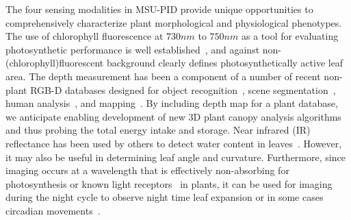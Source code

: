 
The four sensing modalities in MSU-PID provide unique opportunities to comprehensively characterize plant morphological and physiological phenotypes. 
The use of chlorophyll fluorescence at $730nm$ to $750nm$ as a tool for evaluating photosynthetic performance is well established~\cite{baker2008chlorophyll}, and against non-(chlorophyll)fluorescent background clearly defines photosynthetically active leaf area.
The depth measurement has been a component of a number of recent non-plant RGB-D databases designed for object recognition~\cite{Lai2011}, scene segmentation~\cite{Silberman2011}, human analysis~\cite{Sung2011,Barbosa:reid12}, and mapping~\cite{sturm12iros}. 
By including depth map for a plant database, we anticipate enabling development of new $3$D plant canopy analysis algorithms and thus probing the total energy intake and storage.
Near infrared (IR) reflectance has been used by others to detect water content in leaves~\cite{chen2014dissecting}.  
However, it may also be useful in determining leaf angle and curvature.  
Furthermore, since imaging occurs at a wavelength that is effectively non-absorbing for photosynthesis or known light receptors~\cite{butler1964actton,eskins1992light} in plants, it can be used for imaging during the night cycle to observe night time leaf expansion or in some cases circadian movements~\cite{mcclung2006plant}.







